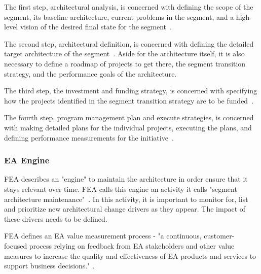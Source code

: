 The first step, architectural analysis, is concerned with defining the scope of the segment, its baseline architecture, current problems in the segment, and a high-level vision of the desired final state for the segment~\cite{FEA_PMO2007}.

The second step, architectural definition, is concerned with defining the detailed target architecture of the segment~\cite{FEA_PMO2007}. Aside for the architecture itself, it is also necessary to define a roadmap of projects to get there, the segment transition strategy, and the performance goals of the architecture. 
  
The third step, the investment and funding strategy, is concerned with specifying how the projects identified in the segment transition strategy are to be funded~\cite{FEA_PMO2007}. 

The fourth step, program management plan and execute strategies, is concerned with making detailed plans for the individual projects, executing the plans, and defining performance measurements for the initiative~\cite{FEA_PMO2007}.

    
\subsubsection{EA Engine}

FEA describes an "engine" to maintain the architecture in order ensure that it stays relevant over time. FEA calls this engine an activity it calls "segment architecture maintenance"~\cite{FEA_PMO2007}. In this activity, it is important to monitor for, list and prioritize new architectural change drivers as they appear. The impact of these drivers needs to be defined. 


FEA  defines  an EA value measurement process -  "a continuous, customer- focused process relying on feedback from EA stakeholders and other value measures to increase the quality and effectiveness of EA products and services to support business decisions." \cite[Sec. 5]{FEA_PMO2007}.

